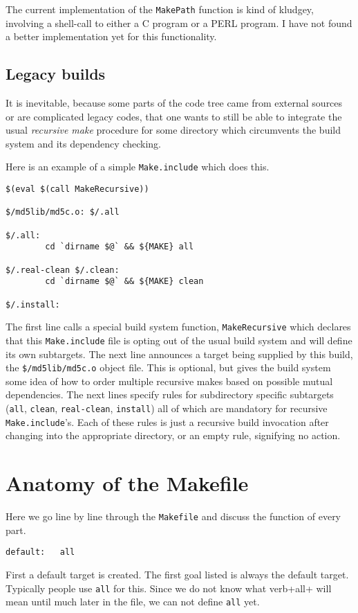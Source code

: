 \documentclass[letterpaper]{article}
\begin{document}
The current implementation of the \verb+MakePath+ function is kind of
kludgey, involving a shell-call to either a C program or a PERL
program.  I have not found a better implementation yet for this
functionality.

\subsection{Legacy builds}

It is inevitable, because some parts of the code tree
came from external sources or are complicated legacy codes, that one
wants to still be able to integrate the usual {\em recursive make}
procedure for some directory which circumvents the build system
and its dependency checking.

Here is an example of a simple \verb+Make.include+ which does this.
\begin{verbatim}
$(eval $(call MakeRecursive))

$/md5lib/md5c.o: $/.all

$/.all:
        cd `dirname $@` && ${MAKE} all

$/.real-clean $/.clean:
        cd `dirname $@` && ${MAKE} clean

$/.install:
\end{verbatim}
The first line calls a special build system function,
\verb+MakeRecursive+ which declares that this \verb+Make.include+ file
is opting out of the usual build system and will define its own
subtargets.  The next line announces a target being supplied by this
build, the \verb+$/md5lib/md5c.o+ object file.  This is optional, but
gives the build system some idea of how to order multiple recursive
makes based on possible mutual dependencies.  The next lines specify
rules for subdirectory specific subtargets (\verb+all+, \verb+clean+,
\verb+real-clean+, \verb+install+) all of which are mandatory for
recursive \verb+Make.include+'s.  Each of these rules is just a
recursive build invocation after changing into the appropriate
directory, or an empty rule, signifying no action.

\section{Anatomy of the Makefile}

Here we go line by line through the \verb+Makefile+ and discuss the function
of every part.

\begin{verbatim}
default:   all
\end{verbatim}
First a default target is created.  The first goal listed is always
the default target.  Typically people use \verb+all+ for this.  Since
we do not know what verb+all+ will mean until much later in the file,
we can not define \verb+all+ yet.
\end{document}
